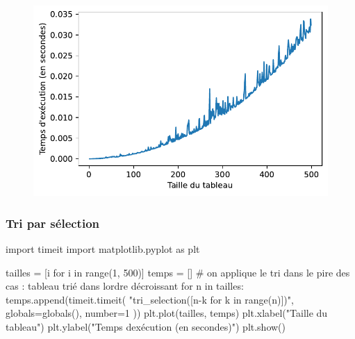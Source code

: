 \documentclass[
  a4paper,
  DIV=11,
  numbers=noendperiod]{scrartcl}
\newenvironment{Shaded}{\begin{snugshade}}{\end{snugshade}}
\newcommand{\BuiltInTok}[1]{\textcolor[rgb]{0.00,0.23,0.31}{#1}}
\newcommand{\CommentTok}[1]{\textcolor[rgb]{0.37,0.37,0.37}{#1}}
\newcommand{\ControlFlowTok}[1]{\textcolor[rgb]{0.00,0.23,0.31}{#1}}
\newcommand{\DecValTok}[1]{\textcolor[rgb]{0.68,0.00,0.00}{#1}}
\newcommand{\ImportTok}[1]{\textcolor[rgb]{0.00,0.46,0.62}{#1}}
\newcommand{\KeywordTok}[1]{\textcolor[rgb]{0.00,0.23,0.31}{#1}}
\newcommand{\NormalTok}[1]{\textcolor[rgb]{0.00,0.23,0.31}{#1}}
\newcommand{\OperatorTok}[1]{\textcolor[rgb]{0.37,0.37,0.37}{#1}}
\newcommand{\StringTok}[1]{\textcolor[rgb]{0.13,0.47,0.30}{#1}}
\begin{document}
\begin{figure}[H]

{\centering \includegraphics{tris_files/figure-pdf/cell-6-output-1.pdf}

}

\end{figure}

\hypertarget{tri-par-suxe9lection-1}{%
\subsubsection{Tri par sélection}\label{tri-par-suxe9lection-1}}

\begin{Shaded}
\begin{Highlighting}[]
\ImportTok{import}\NormalTok{ timeit}
\ImportTok{import}\NormalTok{ matplotlib.pyplot }\ImportTok{as}\NormalTok{ plt}

\NormalTok{tailles }\OperatorTok{=}\NormalTok{ [i }\ControlFlowTok{for}\NormalTok{ i }\KeywordTok{in} \BuiltInTok{range}\NormalTok{(}\DecValTok{1}\NormalTok{, }\DecValTok{500}\NormalTok{)]}
\NormalTok{temps }\OperatorTok{=}\NormalTok{ []}
\CommentTok{\# on applique le tri dans le pire des cas : tableau trié dans l\textquotesingle{}ordre décroissant}
\ControlFlowTok{for}\NormalTok{ n }\KeywordTok{in}\NormalTok{ tailles:}
\NormalTok{    temps.append(timeit.timeit(}
        \StringTok{"tri\_selection([n{-}k for k in range(n)])"}\NormalTok{,}
        \BuiltInTok{globals}\OperatorTok{=}\BuiltInTok{globals}\NormalTok{(),}
\NormalTok{        number}\OperatorTok{=}\DecValTok{1}
\NormalTok{    ))}
\NormalTok{plt.plot(tailles, temps)}
\NormalTok{plt.xlabel(}\StringTok{"Taille du tableau"}\NormalTok{)}
\NormalTok{plt.ylabel(}\StringTok{"Temps d\textquotesingle{}exécution (en secondes)"}\NormalTok{)}
\NormalTok{plt.show()}
\end{Highlighting}
\end{Shaded}
\end{document}
